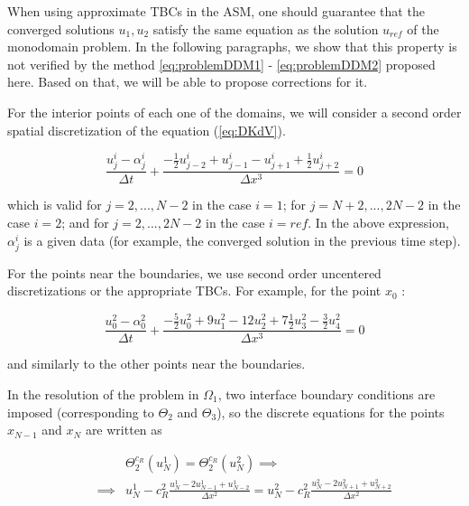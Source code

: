 \indent When using approximate TBCs in the ASM, one should guarantee that the converged solutions $u_1,u_2$ satisfy the same equation as the solution $u_{ref}$ of the monodomain problem. In the following paragraphs, we show that this property is not verified by the method \eqref{eq:problemDDM1} - \eqref{eq:problemDDM2} proposed here. Based on that, we will be able to propose corrections for it.

\indent For the interior points of each one of the domains, we will consider a second order spatial discretization of the equation (\ref{eq:DKdV}).

\begin{equation}
    \label{eq:FDdiscretization}
    \frac{u_j^i - \alpha_j^i}{\Delta t} + \frac{-\frac{1}{2}u_{j-2}^i + u_{j-1}^i - u_{j+1}^i + \frac{1}{2}u_{j+2}^i }{\Delta x ^3} = 0
\end{equation}

\noindent which is valid for $j=2,...,N-2$ in the case $i=1$; for $j=N+2,...,2N-2$ in the case $i=2$; and for $j=2,...,2N-2$ in the case $i=ref$. In the above expression, $\alpha_j^i$ is a given data (for example, the converged solution in the previous time step).

\indent For the points near the boundaries, we use second order uncentered discretizations or the appropriate TBCs. For example, for the point $x_0$ : 

\begin{equation}
    \label{eq:uncenteredFDdiscretization0}
    \frac{u_{0}^2 - \alpha_{0}^2}{\Delta t} + \frac{-\frac{5}{2}u_{0}^2 + 9u_{1}^2 - 12 u_{2}^2 + 7\frac{1}{2}u_{3}^2 -\frac{3}{2}u_{4}^2}{\Delta x ^3} = 0
\end{equation}

\noindent and similarly to the other points near the boundaries.

\indent In the resolution of the problem in $\Omega_1$, two interface boundary conditions are imposed (corresponding to $\Theta_2$ and $\Theta_3$), so the discrete equations for the points $x_{N-1}$ and $x_N$ are written as

\begin{equation}
	\begin{aligned}
    \label{eq:TBCsIterOmega1A}
    && 				&\Theta_2^{c_R}(u_N^1) = \Theta_2^{c_R}(u_N^2) \implies \\ 
    && \implies & u_N^1 - c_R^2 \frac{u_N^1 - 2u_{N-1}^1 + u_{N-2}^1}{\Delta x^2} = u_N^2 - c_R^2 \frac{u_N^2 - 2u_{N+1}^2 + u_{N+2}^2}{\Delta x^2} 
    \end{aligned}
\end{equation}

